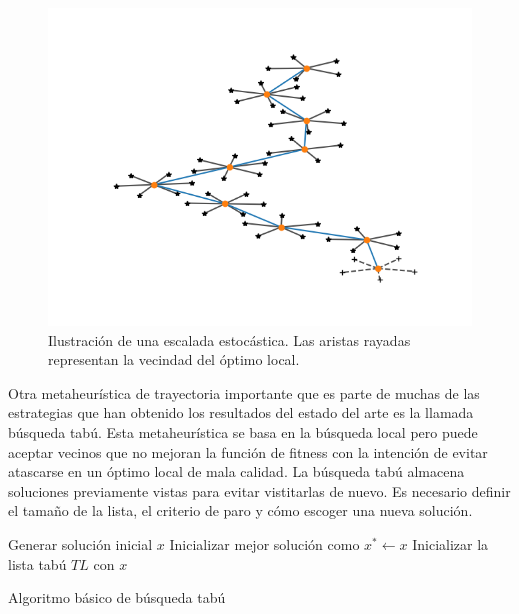 \begin{figure}[H]
\centering
\includegraphics[scale=.7]{Imagenes/mettray.png}
    \caption{Ilustración de una escalada estocástica. Las aristas rayadas representan la vecindad del óptimo local.}
\end{figure}


Otra metaheurística de trayectoria importante que es parte de muchas de las estrategias que han obtenido los resultados del estado del arte es la llamada búsqueda tabú. Esta metaheurística se basa en la búsqueda local pero puede aceptar vecinos que no mejoran la función de fitness con la intención de evitar atascarse en un óptimo local de mala calidad. La búsqueda tabú almacena soluciones previamente vistas para evitar vistitarlas de nuevo. Es necesario definir el tamaño de la lista, el criterio de paro y cómo escoger una nueva solución.\\ 

\begin{algorithm}[H]
 Generar solución inicial $x$\;
    Inicializar mejor solución como $x^*\leftarrow x$
 Inicializar la lista tabú $TL$ con $x$\; 
    \label{alg:TS}
    \caption{Algoritmo básico de búsqueda tabú}
\end{algorithm}

